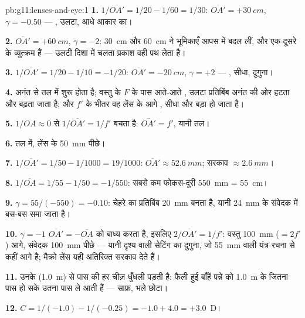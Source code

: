 \begin{solution}{pb:g11:lenses-and-eye:1}
\textbf{1.} $1/\overline{OA'} = 1/20 - 1/60 = 1/30$: $\overline{OA'} = +\qty{30}{cm}$, $\gamma = -0.50$ --- , उलटा, आधे
आकार का।

\textbf{2.} $\overline{OA'} = +\qty{60}{cm}$, $\gamma = -2$: \qty{30}{cm} और \qty{60}{cm} ने भूमिकाएँ आपस में बदल
लीं, और  एक-दूसरे के व्युत्क्रम हैं --- उलटी दिशा में
चलता प्रकाश वही पथ लेता है।

\textbf{3.} $1/\overline{OA'} = 1/20 - 1/10 = -1/20$: $\overline{OA'} = \qty{-20}{cm}$, $\gamma = +2$ --- , सीधा, दुगुना।

\textbf{4.} अनंत से  तल में शुरू होता है; वस्तु के $F$
के पास आते-आते , उलटा प्रतिबिंब अनंत की ओर हटता और
बढ़ता जाता है; और $f'$ के भीतर वह लेंस के आगे
, सीधा और बड़ा हो जाता है।

\textbf{5.} $1/\overline{OA} \approx 0$ से $1/\overline{OA'} = 1/f'$ बचता है: $\overline{OA'} = f'$, यानी  तल।

\textbf{6.}  तल में, लेंस के \qty{50}{mm} पीछे।

\textbf{7.} $1/\overline{OA'} = 1/50 - 1/1000 = 19/1000$: $\overline{OA'} \approx \qty{52.6}{mm}$; सरकाव $\approx \qty{2.6}{mm}$।

\textbf{8.} $1/\overline{OA} = 1/55 - 1/50 = -1/550$: सबसे कम फोकस-दूरी \qty{550}{mm} = \qty{55}{cm}।

\textbf{9.} $\gamma = 55/(-550) = -0.10$: चेहरे का प्रतिबिंब \qty{20}{mm} बनता है, यानी \qty{24}{mm} के
संवेदक में बस-बस समा जाता है।

\textbf{10.} $\gamma = -1$ $\overline{OA'} = -\overline{OA}$ को बाध्य करता है, इसलिए $2/\overline{OA'} = 1/f'$:
वस्तु \qty{100}{mm} ($= 2f'$) आगे, संवेदक \qty{100}{mm} पीछे --- यानी दृश्य वाली
सेटिंग का दुगुना, जो \qty{55}{mm} वाली यंत्र-रचना से कहीं आगे है; मैक्रो लेंस
यही अतिरिक्त सरकाव देते हैं।

\textbf{11.} उनके  (\qty{1.0}{m}) से पास की हर चीज़
धुँधली पड़ती है: फैली हुई बाँहें पन्ने को \qty{1.0}{m} के जितना पास हो सके
उतना पास ले आती हैं --- साफ़, भले छोटा।

\textbf{12.} $C = 1/(-1.0) - 1/(-0.25) = -1.0 + 4.0 = +3.0$~D।


\end{solution}
